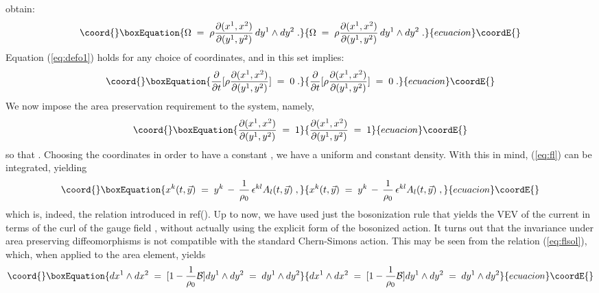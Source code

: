 \documentclass[a4paper,12pt]{article}
\begin{document}
obtain:
\begin{equation}\coord{}\boxEquation{
  \label{eq:defo2}
\Omega \;=\; \rho \frac{\partial (x^1,x^2)}{\partial (y^1,y^2)} \,
dy^1 \land dy^2 \;.
}{
  \Omega \;=\; \rho \frac{\partial (x^1,x^2)}{\partial (y^1,y^2)} \,
dy^1 \land dy^2 \;.
}{ecuacion}\coordE{}\end{equation}
Equation (\ref{eq:defo1}) holds for any choice of coordinates, and
in
this set implies:
\begin{equation}\coord{}\boxEquation{
  \label{equation}
\frac{\partial}{\partial t} [\rho \frac{\partial
(x^1,x^2)}{\partial (y^1,y^2)}] \;=\; 0\;.  
}{
  \frac{\partial}{\partial t} [\rho \frac{\partial
(x^1,x^2)}{\partial (y^1,y^2)}] \;=\; 0\;.  
}{ecuacion}\coordE{}\end{equation}
We now impose the area preservation requirement to the system,
namely,
\begin{equation}\coord{}\boxEquation{
  \label{eq:apt}
 \frac{\partial (x^1,x^2)}{\partial (y^1,y^2)} \;=\; 1
}{
  \frac{\partial (x^1,x^2)}{\partial (y^1,y^2)} \;=\; 1
}{ecuacion}\coordE{}\end{equation}
so that \coordHE{}. Choosing the \coordHE{} coordinates in
order to
have a constant \coordHE{}, we have a uniform and constant density.
With
this in mind, (\ref{eq:fl}) can be integrated, yielding
\begin{equation}\coord{}\boxEquation{
  \label{eq:flsol}
x^k (t,{\vec y}) \;=\; y^k \,-\, \frac{1}{\rho_0} \, \epsilon^{kl}
A_l (t,{\vec y}) \;,
}{
  x^k (t,{\vec y}) \;=\; y^k \,-\, \frac{1}{\rho_0} \, \epsilon^{kl}
A_l (t,{\vec y}) \;,
}{ecuacion}\coordE{}\end{equation}  
which is, indeed, the relation introduced in ref(). Up to now, we
have
used just the bosonization rule that yields the VEV of the current
in
terms of the curl of the gauge field \coordHE{}, without actually
using the
explicit form of the bosonized action. It turns out that the
invariance under area preserving diffeomorphisms is not compatible
with the standard Chern-Simons action. This may be seen from the
relation (\ref{eq:flsol}), which, when applied to the area element,
yields
\begin{equation}\coord{}\boxEquation{
  \label{eq:apt1}
dx^1 \land dx^2 \;=\; [ 1 - \frac{1}{\rho_0} {\mathcal B} ] dy^1
\land dy^2
\;=\; dy^1 \land dy^2  
}{
  dx^1 \land dx^2 \;=\; [ 1 - \frac{1}{\rho_0} {\mathcal B} ] dy^1
\land dy^2
\;=\; dy^1 \land dy^2  
}{ecuacion}\coordE{}\end{equation}
\end{document}
